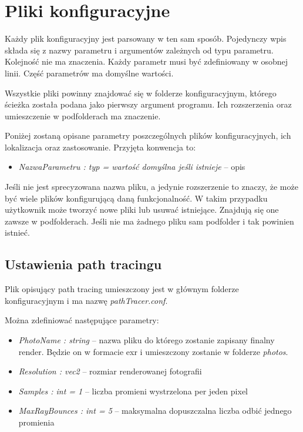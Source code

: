 \documentclass[inz,shortabstract]{iithesis}
\begin{document}
    \section{Pliki konfiguracyjne}
        Każdy plik konfiguracyjny jest parsowany w ten sam sposób. Pojedynczy wpis składa się z nazwy parametru i argumentów zależnych od typu parametru. Kolejność nie ma znaczenia. Każdy parametr musi być zdefiniowany w osobnej linii. Część parametrów ma domyślne wartości. 
        
        Wszystkie pliki powinny znajdować się w folderze konfiguracyjnym, którego ścieżka została podana jako pierwszy argument programu. Ich rozszerzenia oraz umieszczenie w podfolderach ma znaczenie.
        
        Poniżej zostaną opisane parametry poszczególnych plików konfiguracyjnych, ich lokalizacja oraz zastosowanie. Przyjęta konwencja to:
        \begin{itemize}
            \item \textit{NazwaParametru : typ = wartość domyślna jeśli istnieje} -- opis
        \end{itemize}
        
        Jeśli nie jest sprecyzowana nazwa pliku, a jedynie rozszerzenie to znaczy, że może być wiele plików konfigurującą daną funkcjonalność. W takim przypadku użytkownik może tworzyć nowe pliki lub usuwać istniejące. Znajdują się one zawsze w podfolderach. Jeśli nie ma żadnego pliku sam podfolder i tak powinien istnieć.
        
        \subsection{Ustawienia path tracingu} \label{pathTracerConfig}
        Plik opisujący path tracing umieszczony jest w głównym folderze konfiguracyjnym i ma nazwę \textit{pathTracer.conf}.
        
        Można zdefiniować następujące parametry:
        \begin{itemize}
            \item \textit{PhotoName : string} -- nazwa pliku do którego zostanie zapisany finalny render. Będzie on w formacie exr i umieszczony zostanie w folderze \textit{photos}.
            \item \textit{Resolution : vec2} -- rozmiar renderowanej fotografii
            \item \textit{Samples : int = 1} -- liczba promieni wystrzelona per jeden pixel
            \item \textit{MaxRayBounces : int = 5} -- maksymalna dopuszczalna liczba odbić jednego promienia  
        \end{itemize}
\end{document}
